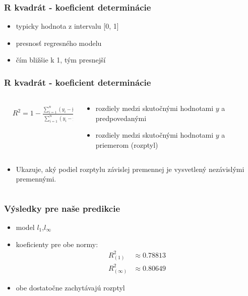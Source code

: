 \documentclass[presentation.tex]{subfiles}
\begin{document}
	
	\begin{frame}
		\frametitle{R kvadrát - koeficient determinácie }
		\begin{itemize}
			\item typicky hodnota z intervalu [0, 1]
			\item presnosť regresného modelu
			\item čím bližšie k 1, tým presnejší
		\end{itemize}
		
		
		

	\end{frame}

	\begin{frame}
		\frametitle{R kvadrát - koeficient determinácie}
		\begin{columns}
			\begin{column}{0.5\textwidth}
				\centering
				\begin{align*}
						&R^2 = 1 - \frac{\sum_{i=1}^{n} (y_i - \hat{y}_i)^2}{\sum_{i=1}^{n} (y_i - \bar{y})^2}
				\end{align*}
			\end{column}
			\begin{column}{0.5\textwidth}
				\begin{itemize}
					\item rozdiely medzi skutočnými hodnotami $y$ a predpovedanými
					\item  rozdiely medzi skutočnými hodnotami $y$ a priemerom (rozptyl)
				\end{itemize}
				
			\end{column}
		\end{columns}

		\begin{columns}
			\begin{column}{\textwidth}
			\begin{itemize}
				\item Ukazuje, aký podiel rozptylu závislej premennej je vysvetlený nezávislými premennými.
			\end{itemize}
			\end{column}
		\end{columns}
	\end{frame}

	\begin{frame}
		\frametitle{Výsledky pre naše predikcie}
				\begin{itemize}
					\item model $l_1$,$l_{\infty}$
					\item koeficienty pre obe normy: \begin{align*} R^{2}_{(1)} &\approx  0.78813\\
															     R^{2}_{(\infty)} &\approx 0.80649
													\end{align*}
					\item obe dostatočne zachytávajú rozptyl
				\end{itemize}
			
	\end{frame}
	
\end{document}
